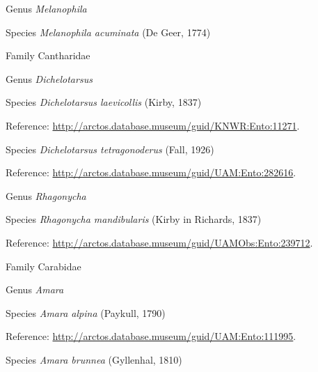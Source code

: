 \documentclass[9pt, article]{memoir}
\begin{document}
\begin{multicols}{2}
\vspace{6pt}\noindent\hspace{30pt}Genus \textit{Melanophila}


\vspace{6pt}\noindent\hspace{36pt}Species \textit{Melanophila acuminata} (De Geer, 1774)


\vspace{6pt}\noindent\hspace{24pt}Family Cantharidae


\vspace{6pt}\noindent\hspace{30pt}Genus \textit{Dichelotarsus}


\vspace{6pt}\noindent\hspace{36pt}Species \textit{Dichelotarsus laevicollis} (Kirby, 1837)


Reference: 
\url{http://arctos.database.museum/guid/KNWR:Ento:11271}.

\vspace{6pt}\noindent\hspace{36pt}Species \textit{Dichelotarsus tetragonoderus} (Fall, 1926)


Reference: 
\url{http://arctos.database.museum/guid/UAM:Ento:282616}.

\vspace{6pt}\noindent\hspace{30pt}Genus \textit{Rhagonycha}


\vspace{6pt}\noindent\hspace{36pt}Species \textit{Rhagonycha mandibularis} (Kirby in Richards, 1837)


Reference: 
\url{http://arctos.database.museum/guid/UAMObs:Ento:239712}.

\vspace{6pt}\noindent\hspace{24pt}Family Carabidae


\vspace{6pt}\noindent\hspace{30pt}Genus \textit{Amara}


\vspace{6pt}\noindent\hspace{36pt}Species \textit{Amara alpina} (Paykull, 1790)


Reference: 
\url{http://arctos.database.museum/guid/UAM:Ento:111995}.

\vspace{6pt}\noindent\hspace{36pt}Species \textit{Amara brunnea} (Gyllenhal, 1810)



\end{multicols}
\end{document}
